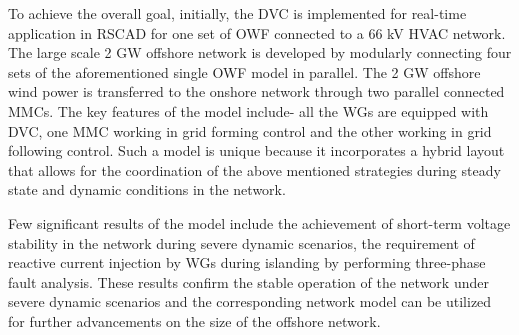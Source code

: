 To achieve the overall goal, initially, the \gls{DVC} is implemented for real-time application in RSCAD for one set of \gls{OWF} connected to a 66 kV \gls{HVAC} network. The large scale 2 GW offshore network is developed by modularly connecting four sets of the aforementioned single \gls{OWF} model in parallel. The 2 GW offshore wind power is transferred to the onshore network through two parallel connected \gls{MMC}s. The key features of the model include- all the \gls{WG}s are equipped with \gls{DVC}, one \gls{MMC} working in grid forming control and the other working in grid following control. Such a model is unique because it incorporates a hybrid layout that allows for the coordination of the above mentioned strategies during steady state and dynamic conditions in the network.    


Few significant results of the model include the achievement of short-term voltage stability in the network during severe dynamic scenarios, the requirement of reactive current injection by \gls{WG}s during islanding by performing three-phase fault analysis. These results confirm the stable operation of the network under severe dynamic scenarios and the corresponding network model can be utilized for further advancements on the size of the offshore network.  





